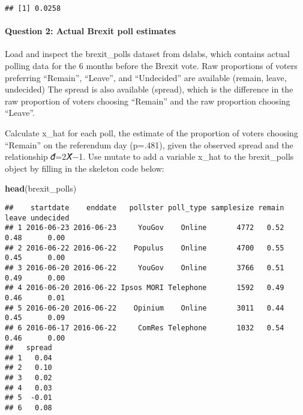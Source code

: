 \documentclass[
]{article}
\newenvironment{Shaded}{\begin{snugshade}}{\end{snugshade}}
\newcommand{\CommentTok}[1]{\textcolor[rgb]{0.56,0.35,0.01}{\textit{#1}}}
\newcommand{\DataTypeTok}[1]{\textcolor[rgb]{0.13,0.29,0.53}{#1}}
\newcommand{\DecValTok}[1]{\textcolor[rgb]{0.00,0.00,0.81}{#1}}
\newcommand{\KeywordTok}[1]{\textcolor[rgb]{0.13,0.29,0.53}{\textbf{#1}}}
\newcommand{\NormalTok}[1]{#1}
\newcommand{\OperatorTok}[1]{\textcolor[rgb]{0.81,0.36,0.00}{\textbf{#1}}}
\newcommand{\StringTok}[1]{\textcolor[rgb]{0.31,0.60,0.02}{#1}}
\begin{document}
\begin{verbatim}
## [1] 0.0258
\end{verbatim}

\hypertarget{question-2-actual-brexit-poll-estimates}{%
\paragraph{Question 2: Actual Brexit poll
estimates}\label{question-2-actual-brexit-poll-estimates}}

Load and inspect the brexit\_polls dataset from dslabs, which contains
actual polling data for the 6 months before the Brexit vote. Raw
proportions of voters preferring ``Remain'', ``Leave'', and
``Undecided'' are available (remain, leave, undecided) The spread is
also available (spread), which is the difference in the raw proportion
of voters choosing ``Remain'' and the raw proportion choosing ``Leave''.

Calculate x\_hat for each poll, the estimate of the proportion of voters
choosing ``Remain'' on the referendum day (p=.481), given the observed
spread and the relationship 𝑑̂=2𝑋̂−1. Use mutate to add a variable x\_hat
to the brexit\_polls object by filling in the skeleton code below:

\begin{Shaded}
\begin{Highlighting}[]
\KeywordTok{head}\NormalTok{(brexit\_polls)}
\end{Highlighting}
\end{Shaded}

\begin{verbatim}
##    startdate    enddate   pollster poll_type samplesize remain leave undecided
## 1 2016-06-23 2016-06-23     YouGov    Online       4772   0.52  0.48      0.00
## 2 2016-06-22 2016-06-22    Populus    Online       4700   0.55  0.45      0.00
## 3 2016-06-20 2016-06-22     YouGov    Online       3766   0.51  0.49      0.00
## 4 2016-06-20 2016-06-22 Ipsos MORI Telephone       1592   0.49  0.46      0.01
## 5 2016-06-20 2016-06-22    Opinium    Online       3011   0.44  0.45      0.09
## 6 2016-06-17 2016-06-22     ComRes Telephone       1032   0.54  0.46      0.00
##   spread
## 1   0.04
## 2   0.10
## 3   0.02
## 4   0.03
## 5  -0.01
## 6   0.08
\end{verbatim}

\begin{Shaded}
\end{Shaded}
\end{document}
